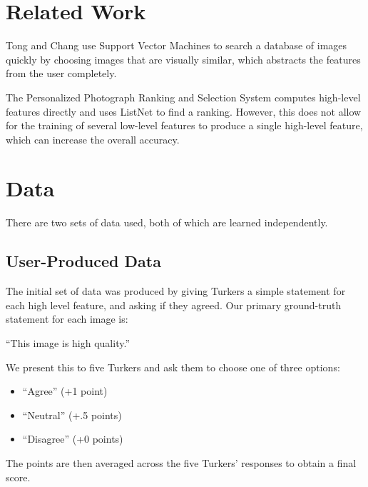 \documentclass[11pt,letter]{article}
\begin{document}
\begin{figure*}[h!]
  \centering
  \caption{This is what Turkers see when rating the image. Here, there are two high level features: blur quality and exposure quality. The first statement (``This image is high quality'') is the ground truth. See Section \ref{turkdata} for details.}
  \label{fig:turkexample}
\end{figure*}

\section{Related Work}
Tong and Chang\cite{Tong:2001:SVM:500141.500159} use Support Vector Machines to search a database of images quickly by choosing images that are visually similar, which abstracts the features from the user completely.

The Personalized Photograph Ranking and Selection System\cite{Yeh:2010:PPR:1873951.1873963} computes high-level features directly and uses ListNet\cite{Cao:2007:LRP:1273496.1273513} to find a ranking. However, this does not allow for the training of several low-level features to produce a single high-level feature, which can increase the overall accuracy.

\section{Data}

There are two sets of data used, both of which are learned independently.

\subsection{User-Produced Data}
\label{turkdata}
The initial set of data was produced by giving Turkers a simple statement for each high level feature, and asking if they agreed. Our primary ground-truth statement for each image is:

``This image is high quality.''

We present this to five Turkers and ask them to choose one of three options:

\begin{itemize}
\item ``Agree'' (+1 point)
\item ``Neutral'' (+.5 points)
\item ``Disagree'' (+0 points)
\end{itemize}
The points are then averaged across the five Turkers' responses to obtain a final score.
\end{document}
